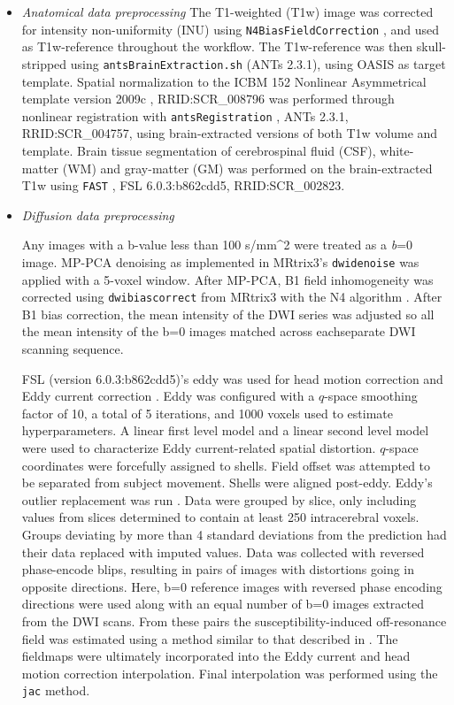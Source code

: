 \documentclass[fleqn,10pt]{wlscirep}
\begin{document}
\begin{itemize}

\item {\it Anatomical data preprocessing}
The T1-weighted (T1w) image was corrected for intensity non-uniformity
(INU) using \texttt{N4BiasFieldCorrection} \cite[ANTs 2.3.1]{n4}, and
used as T1w-reference throughout the workflow. The T1w-reference was
then skull-stripped using \texttt{antsBrainExtraction.sh} (ANTs 2.3.1),
using OASIS as target template. Spatial normalization to the ICBM 152
Nonlinear Asymmetrical template version 2009c
\cite{mni}, RRID:SCR\_008796 was performed through nonlinear
registration with \texttt{antsRegistration} \cite{ants}, ANTs 2.3.1,
RRID:SCR\_004757, using brain-extracted versions of both T1w
volume and template. Brain tissue segmentation of cerebrospinal fluid
(CSF), white-matter (WM) and gray-matter (GM) was performed on the
brain-extracted T1w using \texttt{FAST} \cite{fsl_fast}, FSL 6.0.3:b862cdd5, RRID:SCR\_002823.

\item {\it Diffusion data preprocessing}

Any images with a b-value less than 100 s/mm\^{}2 were treated as a
\emph{b}=0 image. MP-PCA denoising as implemented in MRtrix3's
\texttt{dwidenoise}\cite{dwidenoise1} was applied with a 5-voxel
window. After MP-PCA, B1 field inhomogeneity was corrected using
\texttt{dwibiascorrect} from MRtrix3 with the N4 algorithm \cite{n4}.
After B1 bias correction, the mean intensity of the DWI series was
adjusted so all the mean intensity of the b=0 images matched across
eachseparate DWI scanning sequence.

FSL (version 6.0.3:b862cdd5)'s eddy was used for head motion correction
and Eddy current correction \cite{anderssoneddy}. Eddy was configured
with a \(q\)-space smoothing factor of 10, a total of 5 iterations, and
1000 voxels used to estimate hyperparameters. A linear first level model
and a linear second level model were used to characterize Eddy
current-related spatial distortion. \(q\)-space coordinates were
forcefully assigned to shells. Field offset was attempted to be
separated from subject movement. Shells were aligned post-eddy. Eddy's
outlier replacement was run \cite{eddyrepol}. Data were grouped by
slice, only including values from slices determined to contain at least
250 intracerebral voxels. Groups deviating by more than 4 standard
deviations from the prediction had their data replaced with imputed
values. Data was collected with reversed phase-encode blips, resulting
in pairs of images with distortions going in opposite directions. Here,
b=0 reference images with reversed phase encoding directions were used
along with an equal number of b=0 images extracted from the DWI scans.
From these pairs the susceptibility-induced off-resonance field was
estimated using a method similar to that described in \cite{topup}. The
fieldmaps were ultimately incorporated into the Eddy current and head
motion correction interpolation. Final interpolation was performed using
the \texttt{jac} method.


\end{itemize}
\end{document}
